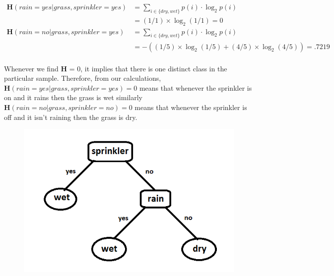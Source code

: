 \documentclass[10pt,a4paper]{article}
\newcommand{\h}{\textbf{H}}
\newcommand{\ig}{\textbf{InfoGain}}
\newcommand{\sdw}{\displaystyle{ \sum_{i \in \{dry, wet\}} }}
\begin{document}
\begin{enumerate}
			
			\begin{equation*}
				\begin{split}
					\h(rain=yes | grass, sprinkler = yes) & = \sdw p(i) \cdot \log_2 p(i) \\
					& = (1/1)\times\log_2(1/1) = 0 \\
					\h(rain=no | grass, sprinkler = yes) & = \sdw p(i) \cdot \log_2 p(i) \\
					& = -( (1/5)\times\log_2(1/5) + (4/5)\times\log_2(4/5) ) = .7219 \\
				\end{split}
			\end{equation*}
			
		Whenever we find \h \; = 0, it implies that there is one distinct class in the particular sample. Therefore, from our calculations, $\h(rain=yes | grass, sprinkler = yes) = 0$ means that whenever the sprinkler is on and it rains then the grass is wet similarly $ \h(rain=no | grass, sprinkler = no) = 0 $ means that whenever the sprinkler is off and it isn't raining then the grass is dry. 
		
		\begin{figure}[ht!]
			\centering
			\includegraphics[scale=.5]{dtree}
		\end{figure}
		

\end{enumerate}
\end{document}
